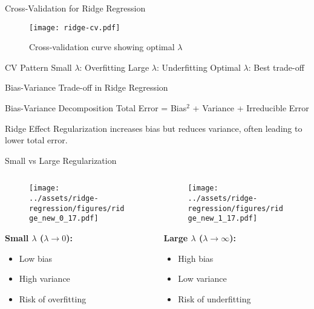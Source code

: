 \documentclass{beamer}
\begin{document}
\begin{frame}{Cross-Validation for Ridge Regression}
\begin{figure}
\centering
\texttt{[image: ridge-cv.pdf]}
\caption{{\small Cross-validation curve showing optimal $\lambda$}}
\end{figure}

\vspace{-0.1cm}
\begin{keypointsbox}{CV Pattern}
{\footnotesize 
Small $\lambda$: Overfitting \quad Large $\lambda$: Underfitting \quad Optimal $\lambda$: Best trade-off
}
\end{keypointsbox}
\end{frame}

\begin{frame}{Bias-Variance Trade-off in Ridge Regression}
\begin{theorembox}{Bias-Variance Decomposition}
Total Error = Bias$^2$ + Variance + Irreducible Error
\end{theorembox}
\pause

\begin{keypointsbox}{Ridge Effect}
Regularization increases bias but reduces variance, often leading to lower total error.
\end{keypointsbox}
\end{frame}

\begin{frame}{Small vs Large Regularization}
\begin{columns}
\begin{column}{0.48\textwidth}
\begin{figure}
\texttt{[image: ../assets/ridge-regression/figures/ridge\_new\_0\_17.pdf]}
\end{figure}
\textbf{Small $\lambda$ ($\lambda \to 0$):}
\begin{itemize}
\item Low bias
\item High variance
\item Risk of overfitting
\end{itemize}
\end{column}
\begin{column}{0.48\textwidth}
\begin{figure}
\texttt{[image: ../assets/ridge-regression/figures/ridge\_new\_1\_17.pdf]}
\end{figure}
\textbf{Large $\lambda$ ($\lambda \to \infty$):}
\begin{itemize}
\item High bias
\item Low variance  
\item Risk of underfitting
\end{itemize}
\end{column}
\end{columns}
\end{frame}
\end{document}
